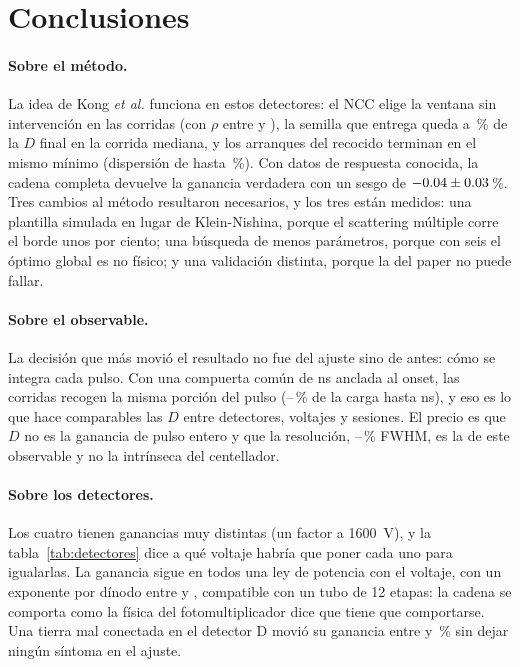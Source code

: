 \documentclass[11pt,a4paper]{article}
\newcommand{\kMin}{\pgfmathprintnumber[fixed,precision=2]{\kMinCrudo}}
\newcommand{\kMax}{\pgfmathprintnumber[fixed,precision=2]{\kMaxCrudo}}
\begin{document}
\section{Conclusiones}
\label{sec:conclusiones}

\paragraph{Sobre el método.} La idea de Kong \emph{et al.} funciona en estos
detectores: el NCC elige la ventana sin intervención en las \NCorridas{}
corridas (con $\rho$ entre \RhoMin{} y \RhoMax), la semilla que entrega queda
a \SemillaMediana\,\% de la $D$ final en la corrida mediana, y los
\NArranques{} arranques del recocido terminan en el mismo mínimo (dispersión
de hasta \DispersionMax\,\%). Con datos de respuesta conocida, la cadena
completa devuelve la ganancia verdadera con un sesgo de
$-0.04 \pm 0.03$\,\%. Tres cambios al método
resultaron necesarios, y los tres están medidos: una plantilla simulada en
lugar de Klein-Nishina, porque el scattering múltiple corre el borde unos
por ciento; una búsqueda de menos parámetros, porque con seis el óptimo
global es no físico; y una validación distinta, porque la del paper no puede
fallar.

\paragraph{Sobre el observable.} La decisión que más movió el resultado no
fue del ajuste sino de antes: cómo se integra cada pulso. Con una compuerta
común de \PostFijo{} ns anclada al onset, las \NCorridas{} corridas recogen
la misma porción del pulso (\CargaComunMin--\CargaComunMax\,\% de la carga
hasta \TComun{} ns), y eso es lo que hace comparables las $D$ entre
detectores, voltajes y sesiones. El precio es que $D$ no es la ganancia de
pulso entero y que la resolución, \FwhmMin--\FwhmMax\,\% FWHM, es la de este
observable y no la intrínseca del centellador.

\paragraph{Sobre los detectores.} Los cuatro tienen ganancias muy distintas
(un factor \RazonGanancias{} a 1600~V), y la tabla~\ref{tab:detectores} dice a
qué voltaje habría que poner cada uno para igualarlas. La ganancia sigue en
todos una ley de potencia con el voltaje, con un exponente por dínodo entre
\kMin{} y \kMax, compatible con un tubo de 12 etapas: la cadena se comporta
como la física del fotomultiplicador dice que tiene que comportarse. Una
tierra mal conectada en el detector D movió su ganancia entre \RepMin{} y
\RepMax\,\% sin dejar ningún síntoma en el ajuste.
\end{document}
